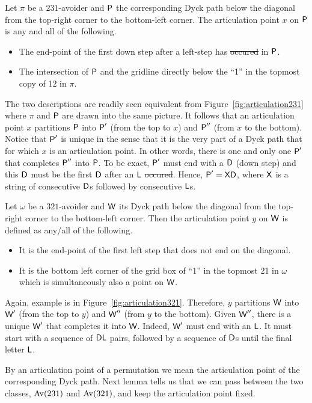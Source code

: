 \documentclass[12pt, a4paper, twoside]{report}
\providecommand{\DIFaddtex}[1]{{\protect\color{blue}\uwave{#1}}} %
\providecommand{\DIFdeltex}[1]{{\protect\color{red}\sout{#1}}}                      %
\providecommand{\DIFaddbegin}{} %
\providecommand{\DIFaddend}{} %
\providecommand{\DIFdelbegin}{} %
\providecommand{\DIFdelend}{} %
\providecommand{\DIFadd}[1]{\texorpdfstring{\DIFaddtex{#1}}{#1}} %
\providecommand{\DIFdel}[1]{\texorpdfstring{\DIFdeltex{#1}}{}} %
\begin{document}
Let $\pi$ be a $231$-avoider and $\textsf{P}$ the corresponding Dyck path below the diagonal from the top-right corner to the bottom-left corner. The articulation point $x$ on $\textsf{P}$ is any and all of the following.
\begin{itemize}
\item The end-point of the first down step after a left-step has \DIFdelbegin \DIFdel{occured }\DIFdelend \DIFaddbegin \DIFadd{occurred }\DIFaddend in $\textsf{P}$.
\item The intersection of $\textsf{P}$ and the gridline directly below the ``1'' in the topmost copy of 12 in $\pi$.
\end{itemize}
The two descriptions are readily seen equivalent from Figure~\ref{fig:articulation231} where $\pi$ and $\textsf{P}$ are drawn into the same picture. It follows that an articulation point $x$ partitions $\textsf{P}$ into $\textsf{P}'$ (from the top to $x$) and $\textsf{P}''$ (from $x$ to the bottom). Notice that $\textsf{P}'$ is unique in the sense that it is the very part of a Dyck path that for which $x$ is an articulation point. In other words, there is one and only one $\textsf{P}'$ that completes $\textsf{P}''$ into $\textsf{P}$. To be exact, $\textsf{P}'$ must end with a $\mathsf{D}$ (down step) and this $\mathsf{D}$ must be the first $\mathsf{D}$ after an $\mathsf{L}$ \DIFdelbegin \DIFdel{occured}\DIFdelend \DIFaddbegin \DIFadd{occurred}\DIFaddend . Hence, $\textsf{P}' = \mathsf{X}\mathsf{D}$, where $\mathsf{X}$ is a string of consecutive $\mathsf{D}$s followed by consecutive $\mathsf{L}$s.

Let $\omega$ be a $321$-avoider and $\textsf{W}$ its Dyck path below the diagonal from the top-right corner to the bottom-left corner. Then the articulation point $y$ on $\textsf{W}$ is defined as any/all of the following.
\begin{itemize}
\item It is the end-point of the first left step that does not end on the diagonal.
\item It is the bottom left corner of the grid box of ``1'' in the topmost 21 in $\omega$ which is simultaneously also a point on $\textsf{W}$.
\end{itemize}
Again, example is in Figure~\ref{fig:articulation321}. Therefore, $y$ partitions $\textsf{W}$ into $\textsf{W}'$ (from the top to $y$) and $\textsf{W}''$ (from $y$ to the bottom). Given $\textsf{W}''$, there is a unique $\textsf{W}'$ that completes it into $\textsf{W}$. Indeed, $\textsf{W}'$ must end with an $\mathsf{L}$. It must start with a sequence of $\mathsf{D}\mathsf{L}$ pairs, followed by a sequence of $\mathsf{D}$s until the final letter $\mathsf{L}$.

By an articulation point of a permutation we mean the articulation point of the corresponding Dyck path. Next lemma tells us that we can pass between the two classes, $\mathrm{Av}(231)$ and $\mathrm{Av}(321)$, and keep the articulation point fixed.
\end{document}
